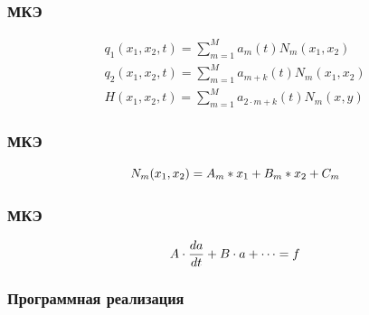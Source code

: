 \documentclass[10pt,utf8,presentation,compress]{beamer}
\begin{document}
\begin{frame}
\frametitle{МКЭ}
	\begin{eqnarray*}
		q_1(x_1, x_2, t) = \sum\limits_{m=1}^{M} a_m(t)N_m(x_1, x_2) \\
		q_2(x_1, x_2, t) = \sum\limits_{m=1}^{M} a_{m+k}(t)N_m(x_1, x_2) \\
		H(x_1, x_2, t) = \sum\limits_{m=1}^{M} a_{2\cdot m+k}(t)N_m(x, y)
	\end{eqnarray*}
\end{frame}

\begin{frame}
\frametitle{МКЭ}
	\begin{equation}
		\Large N_m(x_1, x_2) = A_m * x_1 + B_m * x_2 + C_m
	\end{equation}
\end{frame}

\begin{frame}
\frametitle{МКЭ}
	\begin{equation}
		\Large A \cdot \frac{da}{dt} + B \cdot a + \cdots = f
	\end{equation}
\end{frame}

\begin{frame}
\frametitle{Программная реализация}
	\begin{figure}[H]
		\centering
		\hfill
	\end{figure}
\end{frame}
\end{document}
